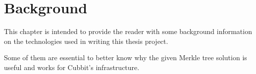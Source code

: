 \chapter{Background}

This chapter is intended to provide the reader with some background information on the technologies used in writing this thesis project.

Some of them are essential to better know why the given Merkle tree solution is useful and works for Cubbit's infrastructure.





